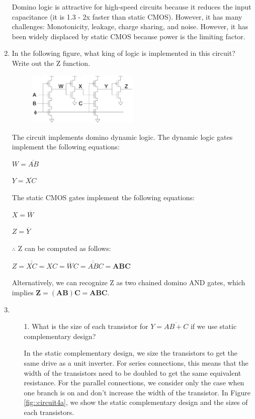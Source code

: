 \documentclass[fleqn]{article}
\begin{document}
\begin{enumerate}
		Domino logic is attractive for high-speed circuits because it reduces the input capacitance (it is 1.3 - 2x faster than static CMOS). However, it has many challenges: Monotonicity, leakage, charge sharing, and noise. However, it has been widely displaced by static CMOS because power is the limiting factor.
		
		\item In the following figure, what king of logic is implemented in this circuit? Write out the Z function.
		
			\begin{figure}[H]
				\centerline{\includegraphics[width=0.5\textwidth]{circuit_question3.png}}
				\label{fig::circuit_question3}
			\end{figure}

			The circuit implements domino dynamic logic. The dynamic logic gates implement the following equations:
			
			$W = \overline{AB}$
			
			$Y = \overline{XC}$
			
			The static CMOS gates implement the following equations:
			
			$X = \overline{W}$
			
			$Z = \overline{Y}$
			
			$\therefore$ Z can be computed as follows:
			
			$Z = \overline{\overline{XC}} = XC = \overline{W}C = \overline{\overline{AB}}C = \mathbf{ABC}$
			
			Alternatively, we can recognize Z as two chained domino AND gates, which implies $\mathbf{Z = (AB)C = ABC}$.
			
		\item ~
		
			\begin{enumerate}
			
			\item[1.] What is the size of each transistor for $Y = \overline{AB + C}$ if we use static complementary design?
			
			In the static complementary design, we size the transistors to get the same drive as a unit inverter. For series connections, this means that the width of the transistors need to be doubled to get the same equivalent resistance. For the parallel connections, we consider only the case when one branch is on and don't increase the width of the transistor. In Figure \ref{fig::circuit4a}, we show the static complementary design and the sizes of each transistors.
			

\end{enumerate}
\end{enumerate}
\end{document}
